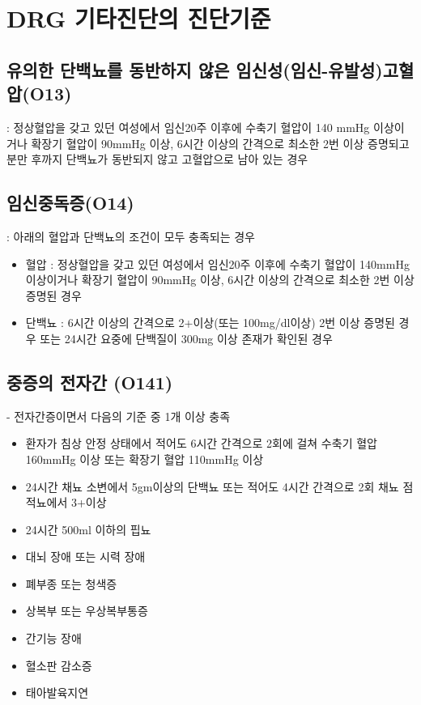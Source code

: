 \section{DRG 기타진단의 진단기준}
\subsection{유의한 단백뇨를 동반하지 않은 임신성(임신-유발성)고혈압(O13)}\label{SUPPIH}
 : 정상혈압을 갖고 있던 여성에서 임신20주 이후에 수축기 혈압이 140 mmHg 이상이거나 확장기 혈압이 90mmHg 이상, 6시간 이상의 간격으로 최소한 2번 이상 증명되고 분만 후까지 단백뇨가 동반되지 않고 고혈압으로 남아 있는 경우

\subsection*{임신중독증(O14)}\label{PIH}
 : 아래의 혈압과 단백뇨의 조건이 모두 충족되는 경우
\begin{itemize}\tightlist
\item 혈압 : 정상혈압을 갖고 있던 여성에서 임신20주 이후에 수축기 혈압이 140mmHg 이상이거나 확장기 혈압이 90mmHg 이상, 6시간 이상의 간격으로 최소한 2번 이상 증명된 경우
\item 단백뇨 : 6시간 이상의 간격으로 2+이상(또는 100mg/dl이상) 2번 이상 증명된 경우 또는 24시간 요중에 단백질이 300mg 이상 존재가 확인된 경우
\end{itemize}

\subsection*{중증의 전자간 (O141)}\label{severePIH}
 - 전자간증이면서 다음의 기준 중 1개 이상 충족
\begin{itemize}\tightlist
\item 환자가 침상 안정 상태에서 적어도 6시간 간격으로 2회에 걸쳐 수축기 혈압 160mmHg 이상 또는 확장기 혈압 110mmHg 이상
\item 24시간 채뇨 소변에서 5gm이상의 단백뇨 또는 적어도 4시간 간격으로 2회 채뇨 점적뇨에서 3+이상
\item 24시간 500ml 이하의 핍뇨
\item 대뇌 장애 또는 시력 장애
\item 폐부종 또는 청색증
\item 상복부 또는 우상복부통증
\item 간기능 장애
\item 혈소판 감소증
\item 태아발육지연
\end{itemize}

